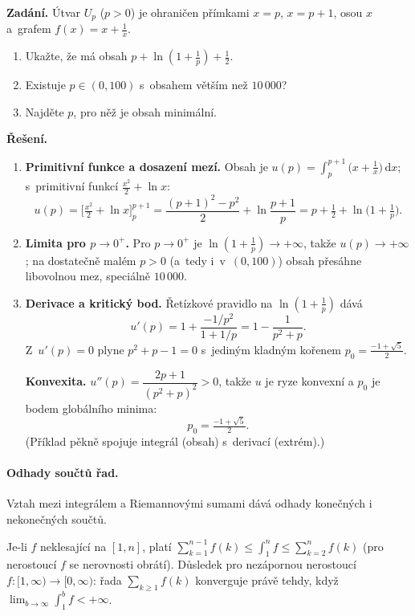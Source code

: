 \documentclass[11pt,a4paper]{article}
\begin{document}
\begin{priklad} \par
\textbf{Zadání.}
Útvar $U_p$ ($p>0$) je ohraničen přímkami $x=p$, $x=p+1$, osou $x$ a~grafem $f(x)=x+\tfrac1x$.
\begin{enumerate}[label=(\arabic*)]
  \item Ukažte, že má obsah $p+\ln(1+\tfrac1p)+\tfrac12$.
  \item Existuje $p\in(0,100)$ s~obsahem větším než $10\,000$?
  \item Najděte $p$, pro něž je obsah minimální.
\end{enumerate}

\textbf{Řešení.}
\begin{enumerate}[label=(\arabic*)]
  \item \textbf{Primitivní funkce a dosazení mezí.} Obsah je $u(p)=\int_p^{p+1}\big(x+\tfrac1x\big)\,\mathrm{d}x$; s~primitivní funkcí $\tfrac{x^2}{2}+\ln x$:
    \[
      u(p)=\Big[\tfrac{x^2}{2}+\ln x\Big]_p^{p+1}=\frac{(p+1)^2-p^2}{2}+\ln\frac{p+1}{p}=p+\tfrac12+\ln\!\big(1+\tfrac1p\big).
    \]
  \item \textbf{Limita pro $p\to0^+$.} Pro $p\to0^+$ je $\ln(1+\tfrac1p)\to+\infty$, takže $u(p)\to+\infty$; na dostatečně malém $p>0$ (a~tedy i~v~$(0,100)$) obsah přesáhne libovolnou mez, speciálně $10\,000$.
  \item \textbf{Derivace a kritický bod.} Řetízkové pravidlo na $\ln(1+\tfrac1p)$ dává
    \[ u'(p)=1+\dfrac{-1/p^2}{1+1/p}=1-\dfrac{1}{p^2+p}. \]
    Z~$u'(p)=0$ plyne $p^2+p-1=0$ s~jediným kladným kořenem $p_0=\tfrac{-1+\sqrt5}{2}$.\par
    \textbf{Konvexita.} $u''(p)=\dfrac{2p+1}{(p^2+p)^2}>0$, takže $u$ je ryze konvexní a $p_0$ je bodem globálního minima:
    \[
      p_0=\tfrac{-1+\sqrt5}{2}.
    \]
    (Příklad pěkně spojuje integrál (obsah) s~derivací (extrém).)
\end{enumerate}
\end{priklad}

\paragraph{Odhady součtů řad.} Vztah mezi integrálem a Riemannovými sumami dává odhady konečných i nekonečných součtů.

\begin{veta}
Je-li $f$ neklesající na $[1,n]$, platí $\sum_{k=1}^{n-1}f(k)\le\int_1^n f\le\sum_{k=2}^{n}f(k)$ (pro nerostoucí $f$ se nerovnosti obrátí). Důsledek pro nezápornou nerostoucí $f:[1,\infty)\to[0,\infty)$: řada $\sum_{k\ge1}f(k)$ konverguje právě tehdy, když $\lim_{b\to\infty}\int_1^b f<+\infty$.
\end{veta}
\end{document}

